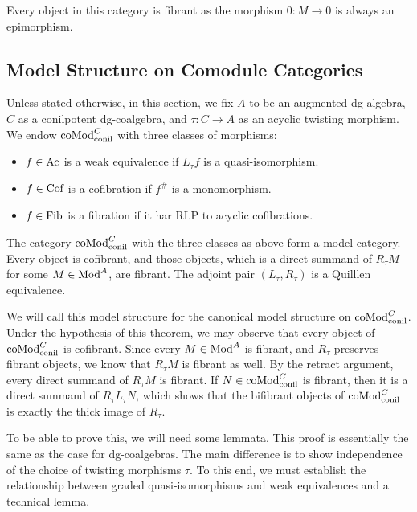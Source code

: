 \documentclass[../thesis.tex]{subfiles}
\begin{document}
            Every object in this category is fibrant as the morphism $0: M \rightarrow 0$ is always an epimorphism.

        \subsection{Model Structure on Comodule Categories}

            Unless stated otherwise, in this section, we fix $A$ to be an augmented dg-algebra, $C$ as a conilpotent dg-coalgebra, and $\tau: C \rightarrow A$ as an acyclic twisting morphism. We endow $\tt{coMod}^C_{\tt{conil}}$ with three classes of morphisms:
            \begin{itemize}
                \item $f\in \tt{Ac}$ is a weak equivalence if $L_\tau f$ is a quasi-isomorphism.
                \item $f\in \tt{Cof}$ is a cofibration if $f^\#$ is a monomorphism.
                \item $f\in \tt{Fib}$ is a fibration if it har RLP to acyclic cofibrations.
            \end{itemize}

            \begin{thm}\label{thm: model-comod}
              The category $\tt{coMod}^C_{\tt{conil}}$ with the three classes as above form a model category. Every object is cofibrant, and those objects, which is a direct summand of $R_\tau M$ for some $M\in \tt{Mod}^A$, are fibrant. The adjoint pair $(L_\tau, R_\tau)$ is a Quilllen equivalence.
            \end{thm}

            We will call this model structure for the canonical model structure on $\tt{coMod}^C_{\tt{conil}}$. Under the hypothesis of this theorem, we may observe that every object of $\tt{coMod}^C_{\tt{conil}}$ is cofibrant. Since every $M\in \tt{Mod}^A$ is fibrant, and $R_\tau$ preserves fibrant objects, we know that $R_\tau M$ is fibrant as well. By the retract argument, every direct summand of $R_\tau M$ is fibrant. If $N\in \tt{coMod}^C_{\tt{conil}}$ is fibrant, then it is a direct summand of $R_\tau L_\tau N$, which shows that the bifibrant objects of $\tt{coMod}^C_{\tt{conil}}$ is exactly the thick image of $R_\tau$.

            To be able to prove this, we will need some lemmata. This proof is essentially the same as the case for dg-coalgebras. The main difference is to show independence of the choice of twisting morphisms $\tau$. To this end, we must establish the relationship between graded quasi-isomorphisms and weak equivalences and a technical lemma.
\end{document}

